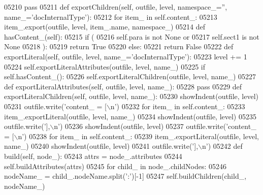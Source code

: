 \begin{DoxyCode}
{{{{{{{{{{{{{{{{{{{{{{{{{{{{{{{{{{{{{{{{{{{{{{{{{{{{{{{{{{{{{{{{{{{{{{{{{{{{{{{{{{{{{{{{{{{{{{{{{{{{{{{{{{{{{{{{{{{{{{{{{{{{{{{{{{{{{{{{{{{{{{{{{{{{{{{{{{{{{{{{{{{{{{{{{{{{{{{{{{{{{{{{{{{{{{{{{{{{{{{{{{{{{{{{{{{{{{{{{{{{{{{{{{{{{{{{{{{{{{{{{{{{{{{{{{{{{{{{{{{{{{{{{{{{{{{{{{{{{{{{{{{{{{{{{{{{{{{{{{{{{{{{{{{{{{{{{{{{{{{{{{{{{{{{{{{{{{{{{{05210         \textcolor{keywordflow}{pass}
05211     \textcolor{keyword}{def }exportChildren(self, outfile, level, namespace\_='', name\_='docInternalType'):
05212         \textcolor{keywordflow}{for} item\_ \textcolor{keywordflow}{in} self.content\_:
05213             item\_.export(outfile, level, item\_.name, namespace\_)
05214     \textcolor{keyword}{def }hasContent_(self):
05215         \textcolor{keywordflow}{if} (
05216             self.para \textcolor{keywordflow}{is} \textcolor{keywordflow}{not} \textcolor{keywordtype}{None} \textcolor{keywordflow}{or}
05217             self.sect1 \textcolor{keywordflow}{is} \textcolor{keywordflow}{not} \textcolor{keywordtype}{None}
05218             ):
05219             \textcolor{keywordflow}{return} \textcolor{keyword}{True}
05220         \textcolor{keywordflow}{else}:
05221             \textcolor{keywordflow}{return} \textcolor{keyword}{False}
05222     \textcolor{keyword}{def }exportLiteral(self, outfile, level, name\_='docInternalType'):
05223         level += 1
05224         self.exportLiteralAttributes(outfile, level, name\_)
05225         \textcolor{keywordflow}{if} self.hasContent_():
05226             self.exportLiteralChildren(outfile, level, name\_)
05227     \textcolor{keyword}{def }exportLiteralAttributes(self, outfile, level, name\_):
05228         \textcolor{keywordflow}{pass}
05229     \textcolor{keyword}{def }exportLiteralChildren(self, outfile, level, name\_):
05230         showIndent(outfile, level)
05231         outfile.write(\textcolor{stringliteral}{'content\_ = [\(\backslash\)n'})
05232         \textcolor{keywordflow}{for} item\_ \textcolor{keywordflow}{in} self.content\_:
05233             item\_.exportLiteral(outfile, level, name\_)
05234         showIndent(outfile, level)
05235         outfile.write(\textcolor{stringliteral}{'],\(\backslash\)n'})
05236         showIndent(outfile, level)
05237         outfile.write(\textcolor{stringliteral}{'content\_ = [\(\backslash\)n'})
05238         \textcolor{keywordflow}{for} item\_ \textcolor{keywordflow}{in} self.content\_:
05239             item\_.exportLiteral(outfile, level, name\_)
05240         showIndent(outfile, level)
05241         outfile.write(\textcolor{stringliteral}{'],\(\backslash\)n'})
05242     \textcolor{keyword}{def }build(self, node\_):
05243         attrs = node\_.attributes
05244         self.buildAttributes(attrs)
05245         \textcolor{keywordflow}{for} child\_ \textcolor{keywordflow}{in} node\_.childNodes:
05246             nodeName\_ = child\_.nodeName.split(\textcolor{stringliteral}{':'})[-1]
05247             self.buildChildren(child\_, nodeName\_)
}}}}}}}}}}}}}}}}}}}}}}}}}}}}}}}}}}}}}}}}}}}}}}}}}}}}}}}}}}}}}}}}}}}}}}}}}}}}}}}}}}}}}}}}}}}}}}}}}}}}}}}}}}}}}}}}}}}}}}}}}}}}}}}}}}}}}}}}}}}}}}}}}}}}}}}}}}}}}}}}}}}}}}}}}}}}}}}}}}}}}}}}}}}}}}}}}}}}}}}}}}}}}}}}}}}}}}}}}}}}}}}}}}}}}}}}}}}}}}}}}}}}}}}}}}}}}}}}}}}}}}}}}}}}}}}}}}}}}}}}}}}}}}}}}}}}}}}}}}}}}}}}}}}}}}}}}}}}}}}}}}}}}}}}}}}}}}}}}}
\end{DoxyCode}
